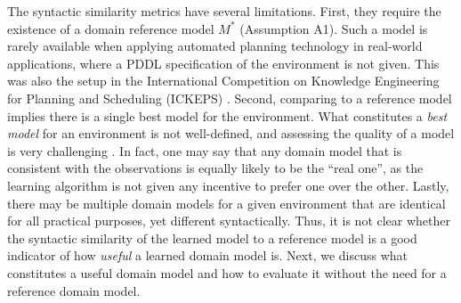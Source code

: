 \documentclass[letterpaper]{article} %
\newcommand{\realm}{{\ensuremath{M^*}}\xspace}
\newif\ifaddcomments
\newcommand{\roni}[1]{\ifaddcomments{\textcolor{red}{[Roni: #1]}}\fi}
\newcommand{\gregor}[1]{\ifaddcomments{\textcolor{orange}{[Gregor: #1]}}\fi}
\begin{document}
The syntactic similarity metrics have several limitations. 
First, they require the existence of a domain reference model $\realm$ (Assumption A1). Such a model is rarely available when applying automated planning technology in real-world applications, where a PDDL specification of the environment is not given. 
This was also the setup in the International Competition on Knowledge Engineering for Planning and Scheduling (ICKEPS) \citep{DBLP:journals/aim/ChrpaMVV17}. 
Second, comparing to a reference model implies there is a single best model for the environment. 
What constitutes a \emph{best model} for an environment is not well-defined, and assessing the quality of a model is very challenging \citep{DBLP:conf/kcap/McCluskeyVV17}. 
In fact, one may say that any domain model that is consistent with the observations is equally likely to be the ``real one'', as the learning algorithm is not given any incentive to prefer one over the other. 
Lastly, there may be multiple domain models for a given environment that are identical for all practical purposes, yet different syntactically. 
Thus, it is not clear whether the syntactic similarity of the learned model to a reference model is a good indicator of how \emph{useful} a learned domain model is. 
Next, we discuss what constitutes a useful domain model and how to evaluate it without the need for a reference domain model.


\end{document}
